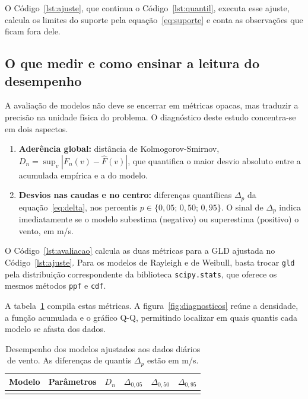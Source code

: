 O Código~\ref{lst:ajuste}, que continua o Código~\ref{lst:quantil}, executa esse ajuste, calcula os limites do suporte pela equação~\eqref{eq:suporte} e conta as observações que ficam fora dele.



\subsection{O que medir e como ensinar a leitura do desempenho}

A avaliação de modelos não deve se encerrar em métricas opacas, mas traduzir a precisão na unidade física do problema. O diagnóstico deste estudo concentra-se em dois aspectos.

\begin{enumerate}
    \item \textbf{Aderência global:} distância de Kolmogorov-Smirnov, $D_n = \sup_v |F_n(v) - \widehat{F}(v)|$, que quantifica o maior desvio absoluto entre a acumulada empírica e a do modelo.
    \item \textbf{Desvios nas caudas e no centro:} diferenças quantílicas $\Delta_p$ da equação~\eqref{eq:delta}, nos percentis $p \in \{0,05;\, 0,50;\, 0,95\}$. O sinal de $\Delta_p$ indica imediatamente se o modelo subestima (negativo) ou superestima (positivo) o vento, em m/s.
\end{enumerate}

O Código~\ref{lst:avaliacao} calcula as duas métricas para a GLD ajustada no Código~\ref{lst:ajuste}. Para os modelos de Rayleigh e de Weibull, basta trocar \texttt{gld} pela distribuição correspondente da biblioteca \texttt{scipy.stats}, que oferece os mesmos métodos \texttt{ppf} e \texttt{cdf}.



A tabela~\ref{tab:desempenho_vento} compila estas métricas. A figura~\ref{fig:diagnosticos} reúne a densidade, a função acumulada e o gráfico Q-Q, permitindo localizar em quais quantis cada modelo se afasta dos dados.

\begin{table}[htbp]
\centering
\caption{Desempenho dos modelos ajustados aos dados diários de vento. As diferenças de quantis $\Delta_p$ estão em m/s.}
\label{tab:desempenho_vento}
\begin{tabular}{lccccc}
\toprule
\textbf{Modelo} & \textbf{Parâmetros} & \textbf{$D_n$} & \textbf{$\Delta_{0,05}$} & \textbf{$\Delta_{0,50}$} & \textbf{$\Delta_{0,95}$} \\
\midrule
\unskip \\
\bottomrule
\end{tabular}
\end{table}

